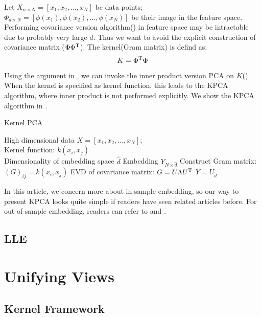 Let $X_{n \times N} = [x_1, x_2, \ldots, x_N]$ be data points; 
$\Phi_{d \times N} = [\phi(x_1), \phi(x_2), \ldots, \phi(x_N)]$ be
their image in the feature space. Performing covariance 
version algorithm(\ralg{\ref{alg:pca_cov}}) in feature space 
may be intractable due to probably very large $ d $. Thus 
we want to avoid the explicit construction of covariance 
matrix ($ \Phi\Phi^\mathrm{T} $). 
The kernel(Gram matrix) is defind as:
\begin{equation}
	K = \Phi^\mathrm{T}\Phi 
\end{equation}
Using the argument in \rsec{\ref{sec:pca}}, we can 
invoke the inner product version PCA on $ K $(\ralg{\ref{alg:pca_in}}). 
When the kernel is specified as kernel function, 
this leads to the KPCA algorithm, where inner product
is not performed explicitly. We show the KPCA algorithm in 
\ralg{\ref{alg:kpac}}. 
 
\begin{algorithm}[htb]
	\caption{Kernel PCA}
	\label{alg:kpac}
	\begin{algorithmic}[1]
		\REQUIRE High dimensional data $X = [x_1, x_2, \ldots, x_N]$; \\
			Kernel function: $ k(x_i,x_j) $\\
			Dimensionality of embedding space $ \hat{d} $
		\ENSURE Embedding $ Y_{N \times \hat{d}} $
		\STATE Construct Gram matrix: $ (G)_{ij} = k(x_i,x_j)$
		\STATE EVD of covariance matrix: $ G = U \Lambda U^\mathrm{T} $
		\STATE $ Y = U_{\hat{d}} $
	\end{algorithmic}
\end{algorithm}

In this article, we concern more about in-sample embedding, so 
our way to present KPCA looks quite simple if readers have 
seen related articles before. For out-of-sample embedding, 
readers can refer to \cite{scholkopf1998kpca} and \cite{bengio2004out}. 

\subsection{LLE}
\label{sec:lle}

\section{Unifying Views}
\label{sec:unify}

\subsection{Kernel Framework}
\label{sec:kfx}

